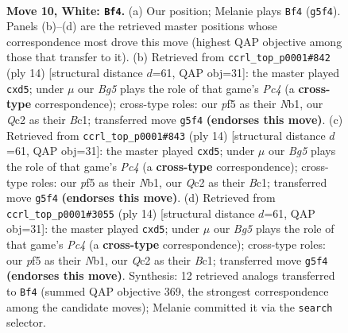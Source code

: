 \documentclass[11pt]{article}
\begin{document}
\clearpage

\begin{figure}[p]\centering
\begin{subfigure}{0.46\textwidth}\centering
\resizebox{\linewidth}{!}{%
\newchessgame
\chessboard[
  setfen={rnbq1rk1/p5pp/2pb1n2/1p1p1pB1/3P4/5NP1/PPQ1PPBP/RN3RK1 w - - 0 10},
  showmover=false,
  pgfstyle=straightmove, color=movearrow, markmove={g5-f4}
]}
\caption{}
\end{subfigure}\hfill
\begin{subfigure}{0.46\textwidth}\centering
\resizebox{\linewidth}{!}{%
\newchessgame
\chessboard[
  setfen={rnbq1rk1/pp2bppp/2p2n2/3p4/2PQ4/5NP1/PP2PPBP/RNB2RK1 w - - 4 8},
  showmover=false,
  pgfstyle=straightmove, color=movearrow, markmove={c4-d5}
]}
\caption{}
\end{subfigure}
\\[4pt]
\begin{subfigure}{0.46\textwidth}\centering
\resizebox{\linewidth}{!}{%
\newchessgame
\chessboard[
  setfen={rnbq1rk1/pp2bppp/2p2n2/3p4/2PQ4/5NP1/PP2PPBP/RNB2RK1 w - - 4 8},
  showmover=false,
  pgfstyle=straightmove, color=movearrow, markmove={c4-d5}
]}
\caption{}
\end{subfigure}\hfill
\begin{subfigure}{0.46\textwidth}\centering
\resizebox{\linewidth}{!}{%
\newchessgame
\chessboard[
  setfen={rnbq1rk1/pp2bppp/2p2n2/3p4/2PQ4/5NP1/PP2PPBP/RNB2RK1 w - - 4 8},
  showmover=false,
  pgfstyle=straightmove, color=movearrow, markmove={c4-d5}
]}
\caption{}
\end{subfigure}
\caption{\textbf{Move 10, White: \texttt{Bf4}.} (a) Our position; Melanie plays \texttt{Bf4} (\texttt{g5f4}). Panels (b)--(d) are the retrieved master positions whose correspondence most drove this move (highest QAP objective among those that transfer to it). (b) Retrieved from \texttt{ccrl\_top\_p0001\#842} (ply 14) [structural distance $d$=61, QAP obj=31]: the master played \texttt{cxd5}; under $\mu$ our \emph{Bg5} plays the role of that game's \emph{Pc4} (a \textbf{cross-type} correspondence); cross-type roles: our \emph{p}f5 as their \emph{N}b1, our \emph{Q}c2 as their \emph{B}c1; transferred move \texttt{g5f4} \textbf{(endorses this move)}. (c) Retrieved from \texttt{ccrl\_top\_p0001\#843} (ply 14) [structural distance $d$=61, QAP obj=31]: the master played \texttt{cxd5}; under $\mu$ our \emph{Bg5} plays the role of that game's \emph{Pc4} (a \textbf{cross-type} correspondence); cross-type roles: our \emph{p}f5 as their \emph{N}b1, our \emph{Q}c2 as their \emph{B}c1; transferred move \texttt{g5f4} \textbf{(endorses this move)}. (d) Retrieved from \texttt{ccrl\_top\_p0001\#3055} (ply 14) [structural distance $d$=61, QAP obj=31]: the master played \texttt{cxd5}; under $\mu$ our \emph{Bg5} plays the role of that game's \emph{Pc4} (a \textbf{cross-type} correspondence); cross-type roles: our \emph{p}f5 as their \emph{N}b1, our \emph{Q}c2 as their \emph{B}c1; transferred move \texttt{g5f4} \textbf{(endorses this move)}. Synthesis: 12 retrieved analogs transferred to \texttt{Bf4} (summed QAP objective 369, the strongest correspondence among the candidate moves); Melanie committed it via the \texttt{search} selector.}
\label{fig:thought-m18}
\end{figure}
\end{document}
